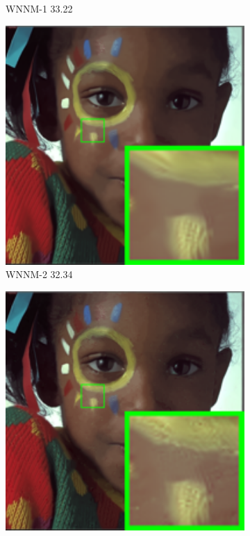 \begin{figure}
\begin{subfigure}[t]{0.19\textwidth}
		\caption{WNNM-1 33.22}
    \end{subfigure}
    \hfill
    \begin{subfigure}[t]{0.19\textwidth}
        \centering
        \includegraphics[width=1\textwidth]{images/mcwnnm/24images/resize_br_WNNMJ_nSig53015_kodim15.png}
		\caption{WNNM-2 32.34}
    \end{subfigure}
    \hfill
    \begin{subfigure}[t]{0.19\textwidth}
        \centering
        \includegraphics[width=1\textwidth]{images/mcwnnm/24images/resize_br_WNNM_ADMM_nSig53015_kodim15.png}

\end{subfigure}
\end{figure}
